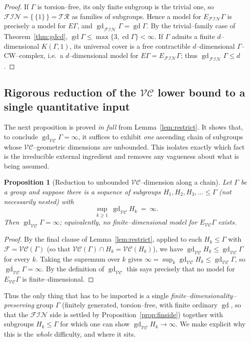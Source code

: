 \documentclass{amsart}
\newtheorem{proposition}{Proposition}
\theoremstyle{definition}
\newcommand{\FIN}{\mathcal{F\!I\!N}}
\newcommand{\VC}{\mathcal{V\!C}}
\newcommand{\gd}{\operatorname{gd}}
\newcommand{\cd}{\operatorname{cd}}
\begin{document}
\begin{proof}
If $\Gamma$ is torsion--free, its only finite subgroup is the trivial one, so
$\FIN=\{\,\{1\}\,\}=\mathcal{TR}$ as families of subgroups. Hence a model for $E_{\FIN}\Gamma$
is precisely a model for $E\Gamma$, and $\gd_{\FIN}\Gamma=\gd\Gamma$. By the trivial--family
case of Theorem~\ref{thm:gdcd}, $\gd\Gamma\le\max\{3,\cd\Gamma\}<\infty$. If $\Gamma$ admits a
finite $d$--dimensional $K(\Gamma,1)$, its universal cover is a free contractible
$d$--dimensional $\Gamma$--CW--complex, i.e.\ a $d$--dimensional model for
$E\Gamma=E_{\FIN}\Gamma$; thus $\gd_{\FIN}\Gamma\le d$.
\end{proof}

\subsection{Rigorous reduction of the \texorpdfstring{$\VC$}{VC} lower bound to a single
quantitative input}\label{subsec:reduction}

The next proposition is proved \emph{in full} from Lemma~\ref{lem:restrict}. It shows that, to
conclude $\gd_{\VC}\Gamma=\infty$, it suffices to exhibit \emph{one} ascending chain of
subgroups whose $\VC$--geometric dimensions are unbounded. This isolates exactly which fact is
the irreducible external ingredient and removes any vagueness about what is being assumed.

\begin{proposition}[Reduction to unbounded $\VC$--dimension along a chain]\label{prop:reduction}
Let $\Gamma$ be a group and suppose there is a sequence of subgroups $H_1,H_2,H_3,\dots\le\Gamma$
(not necessarily nested) with
\[
\sup_{k\ge 1}\ \gd_{\VC}H_k\ =\ \infty .
\]
Then $\gd_{\VC}\Gamma=\infty$; equivalently, no finite--dimensional model for $E_{\VC}\Gamma$
exists.
\end{proposition}

\begin{proof}
By the final clause of Lemma~\ref{lem:restrict}, applied to each $H_k\le\Gamma$ with
$\mathcal F=\VC(\Gamma)$ (so that $\VC(\Gamma)\cap H_k=\VC(H_k)$), we have
$\gd_{\VC}H_k\le\gd_{\VC}\Gamma$ for every $k$. Taking the supremum over $k$ gives
$\infty=\sup_k\gd_{\VC}H_k\le\gd_{\VC}\Gamma$, so $\gd_{\VC}\Gamma=\infty$. By the definition
of $\gd_{\VC}$ this says precisely that no model for $E_{\VC}\Gamma$ is finite--dimensional.
\end{proof}

Thus the only thing that has to be imported is a single \emph{finite--dimensionality--preserving}
group $\Gamma$ (finitely generated, torsion--free, with finite ordinary $\gd$, so that the
$\FIN$ side is settled by Proposition~\ref{prop:finside}) together with subgroups
$H_k\le\Gamma$ for which one can show $\gd_{\VC}H_k\to\infty$. We make explicit why this is the
\emph{whole} difficulty, and where it sits.
\end{document}
